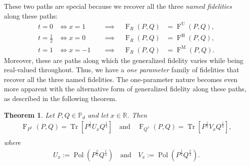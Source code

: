 \documentclass[12pt]{article}
\newtheorem{theorem}{Theorem}[section] %
\theoremstyle{definition}
\newcommand{\Fg}[3]{\operatorname{F}_{#3}\!\left(#1, #2\right)}
\begin{document}
These two paths are special because we recover all the three \textit{named fidelities} along these paths:
\begin{equation}
    \begin{aligned}
        t = 0 &\iff x = 1  \quad &\implies \quad \operatorname{F}_R(P,Q) &= \operatorname{F}^\mathrm U(P,Q), \\
        t = {\textstyle\frac{1}{2}} &\iff x = 0 \quad &\implies \quad \operatorname{F}_R(P,Q) &= \operatorname{F}^\mathrm H(P,Q), \\
        t = 1 &\iff x = -1 \quad &\implies \quad \operatorname{F}_R(P,Q) &= \operatorname{F}^\mathrm M(P,Q).
    \end{aligned}
\end{equation}
Moreover, these are paths along which the generalized fidelity varies while being real-valued throughout. Thus, we have a \textit{one parameter} family of fidelities that recover all the three named fidelities. The one-parameter nature becomes even more apparent with the alternative form of generalized fidelity along these paths, as described in the following theorem. 
\begin{theorembox}
    \begin{theorem}
        Let $P, Q \in \mathbb P_d$ and let $x \in \mathbb R$. Then
        \begin{equation}
            \begin{aligned}
                \Fg{P}{Q}{P^x} = \operatorname{Tr}\left[P^{\frac12}  U_x Q ^{\frac12} \right] \quad \text{and} \quad 
                \Fg{P}{Q}{Q^x} = \operatorname{Tr}\left[P^{\frac12}  V_x Q ^{\frac12} \right], \\
            \end{aligned}
        \end{equation}
        where 
            \begin{equation}
                \begin{aligned}
                    U_x := \operatorname{Pol}\left(P^\frac x2 Q^{\frac12} \right) \quad \text{and} \quad 
                    V_x := \operatorname{Pol}\left(P^{\frac12} Q^\frac x2  \right).
                \end{aligned}
            \end{equation}        
    \end{theorem}
\end{theorembox}
\end{document}
